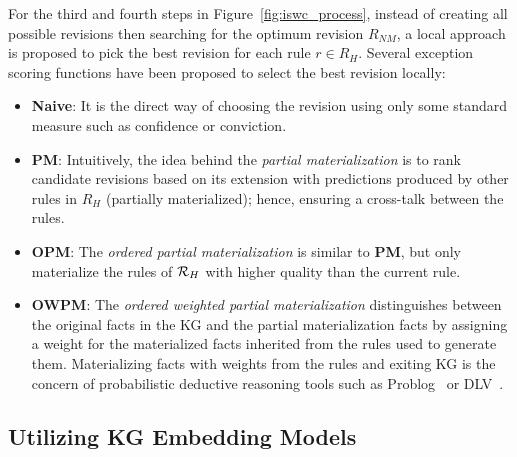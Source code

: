 For the third and fourth steps in Figure~\ref{fig:iswc_process}, instead of creating all possible revisions then searching for the optimum revision $R_{NM}$, a local approach is proposed to pick the best revision for each rule $r \in R_H$. Several exception scoring functions have been proposed to select the best revision locally:
\begin{itemize}
\item \textbf{Naive}: It is the direct way of choosing the revision using only some standard measure such as confidence or conviction.
\item \textbf{PM}: Intuitively, the idea behind the \textit{partial materialization} is to rank candidate revisions based on its extension with predictions produced by other rules in $R_H$ (\ie partially materialized); hence, ensuring a cross-talk between the rules.
\item \textbf{OPM}: The \textit{ordered partial materialization} is similar to \textbf{PM}, but only materialize the rules of $\mathcal{R}_{H}$ with higher quality than the current rule.
\item \textbf{OWPM}: The \textit{ordered weighted partial materialization} distinguishes between the original facts in the KG and the partial materialization facts by assigning a weight for the materialized facts inherited from the rules used to generate them. Materializing facts with weights from the rules and exiting KG is the concern of probabilistic deductive reasoning tools such as Problog~\cite{problog2007,problog2015} or DLV~\cite{dlv2006}.
\end{itemize}



\subsection{Utilizing KG Embedding Models}



 

